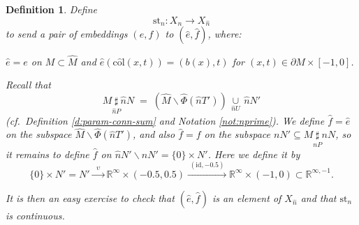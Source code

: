 \documentclass[reqno,a4paper]{article}
\numberwithin{equation}{section}
\theoremstyle{italicised}
\theoremstyle{upright}
\newtheorem{defn}[thm]{Definition}
\theoremstyle{italicised-restate}
\newcommand{\cf}{\textit{cf}.\ }
\newenvironment{itemizeb}%
{\begin{compactitem}
\renewcommand{\labelitemi}{\ensuremath{\bullet}}
\renewcommand{\labelitemii}{\ensuremath{\bullet}}}%
{\end{compactitem}}
\newcommand{\bR}{\mathbb{R}}
\newcommand{\rinftym}{\ensuremath{\bR^{\infty,-1}}}
\newcommand{\colhat}{\ensuremath{\mathrm{c}\hat{\mathrm{o}}\mathrm{l}}}
\begin{document}
\begin{defn}\label{d:stn}
Define
\[
\mathrm{st}_n \colon X_n \longrightarrow X_{\hat{n}}
\]
to send a pair of embeddings $(e,f)$ to $(\hat{e},\hat{f})$, where:
\begin{itemizeb}
\item[(i)] $\hat{e} = e$ on $M \subset \hat{M}$ and $\hat{e}(\colhat(x,t)) = (b(x),t)$ for $(x,t) \in \partial M \times [-1,0]$.
\item[(ii)] Recall that
\[
M \underset{\hat{n}P}{\sharp} \hat{n}N \;=\; (\hat{M} \smallsetminus \hat{\Phi}(\hat{n}T')) \,\underset{\hat{n}U}{\cup}\, \hat{n}N'
\]
(\cf Definition \ref{d:param-conn-sum} and Notation \ref{not:nprime}). We define $\hat{f} = \hat{e}$ on the subspace $\hat{M} \smallsetminus \hat{\Phi}(\hat{n}T')$, and also $\hat{f} = f$ on the subspace $nN' \subseteq M \underset{nP}{\sharp} nN$, so it remains to define $\hat{f}$ on $\hat{n}N' \smallsetminus nN' = \{0\} \times N'$. Here we define it by
\[
\{0\} \times N' = N' \xrightarrow{\;\;\upsilon\;\;} \bR^\infty \times (-0.5,0.5) \xrightarrow{\;(\mathrm{id},-0.5)\;} \bR^\infty \times (-1,0) \subset \rinftym.
\]
\end{itemizeb}
It is then an easy exercise to check that $(\hat{e},\hat{f})$ is an element of $X_{\hat{n}}$ and that $\mathrm{st}_n$ is continuous.
\end{defn}
\end{document}
